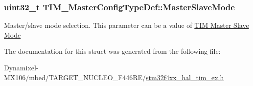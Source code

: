 \subsubsection[{\texorpdfstring{Master\+Slave\+Mode}{MasterSlaveMode}}]{\setlength{\rightskip}{0pt plus 5cm}uint32\+\_\+t T\+I\+M\+\_\+\+Master\+Config\+Type\+Def\+::\+Master\+Slave\+Mode}\hypertarget{struct_t_i_m___master_config_type_def_a45ddfca310a1180e19fc24b36f8e9585}{}\label{struct_t_i_m___master_config_type_def_a45ddfca310a1180e19fc24b36f8e9585}
Master/slave mode selection. This parameter can be a value of \hyperlink{group___t_i_m___master___slave___mode}{T\+IM Master Slave Mode} 

The documentation for this struct was generated from the following file\+:\begin{DoxyCompactItemize}
\item 
Dynamixel-\/\+M\+X106/mbed/\+T\+A\+R\+G\+E\+T\+\_\+\+N\+U\+C\+L\+E\+O\+\_\+\+F446\+R\+E/\hyperlink{stm32f4xx__hal__tim__ex_8h}{stm32f4xx\+\_\+hal\+\_\+tim\+\_\+ex.\+h}\end{DoxyCompactItemize}
